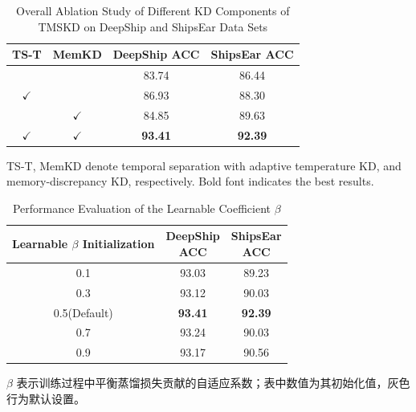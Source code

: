 \documentclass[a4paper, 12pt]{article}
\begin{document}
\begin{table}[htbp]
\centering
\small
\caption{Overall Ablation Study of Different KD Components of TMSKD on DeepShip and ShipsEar Data Sets}
\label{tab:ablation}
\setlength{\tabcolsep}{10pt}

\begin{tabular}{c|c|c|c}
\toprule
TS-T & MemKD  & DeepShip ACC & ShipsEar ACC \\
\midrule
    &      & 83.74 & 86.44 \\
$\checkmark$ &     &86.93 & 88.30 \\
 & $\checkmark$ &84.85 & 89.63 \\
$\checkmark$ & $\checkmark$ & \textbf{93.41} & \textbf{92.39} \\
\bottomrule
\end{tabular}
\vspace{2mm}

\begin{flushleft}
\footnotesize
TS-T, MemKD denote temporal separation with adaptive temperature KD, and memory-discrepancy KD, respectively. Bold font indicates the best results.
\end{flushleft}

\end{table}


\begin{table}[htbp]
\centering
\caption{Performance Evaluation of the Learnable Coefficient $\beta$}
\label{tab:beta_analysis}
\small
\setlength{\tabcolsep}{10pt}
\begin{tabular}{c|c|c}
\toprule
\makecell{Learnable $\beta$\\Initialization} &
\makecell{DeepShip\\ACC} &
\makecell{ShipsEar\\ACC} \\
\midrule
0.1 & 93.03 & 89.23 \\
0.3 & 93.12 & 90.03 \\
\rowcolor{gray!15}
0.5(Default) & \textbf{93.41} & \textbf{92.39} \\
0.7 & 93.24 & 90.03 \\
0.9 & 93.17 & 90.56 \\
\bottomrule
\end{tabular}
\vspace{0.5ex}
\par\footnotesize $\beta$ 表示训练过程中平衡蒸馏损失贡献的自适应系数；表中数值为其初始化值，灰色行为默认设置。
\end{table}
\end{document}
